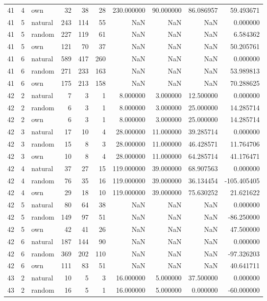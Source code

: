 \begin{table}[htbp]
\begin{tabular}{rrlrrrrrrr}
41 & 4 & own & 32 & 38 & 28 & 230.000000 & 90.000000 & 86.086957 & 59.493671 \\
41 & 5 & natural & 243 & 114 & 55 & NaN & NaN & NaN & 0.000000 \\
41 & 5 & random & 227 & 119 & 61 & NaN & NaN & NaN & 6.584362 \\
41 & 5 & own & 121 & 70 & 37 & NaN & NaN & NaN & 50.205761 \\
41 & 6 & natural & 589 & 417 & 260 & NaN & NaN & NaN & 0.000000 \\
41 & 6 & random & 271 & 233 & 163 & NaN & NaN & NaN & 53.989813 \\
41 & 6 & own & 175 & 213 & 158 & NaN & NaN & NaN & 70.288625 \\
42 & 2 & natural & 7 & 3 & 1 & 8.000000 & 3.000000 & 12.500000 & 0.000000 \\
42 & 2 & random & 6 & 3 & 1 & 8.000000 & 3.000000 & 25.000000 & 14.285714 \\
42 & 2 & own & 6 & 3 & 1 & 8.000000 & 3.000000 & 25.000000 & 14.285714 \\
42 & 3 & natural & 17 & 10 & 4 & 28.000000 & 11.000000 & 39.285714 & 0.000000 \\
42 & 3 & random & 15 & 8 & 3 & 28.000000 & 11.000000 & 46.428571 & 11.764706 \\
42 & 3 & own & 10 & 8 & 4 & 28.000000 & 11.000000 & 64.285714 & 41.176471 \\
42 & 4 & natural & 37 & 27 & 15 & 119.000000 & 39.000000 & 68.907563 & 0.000000 \\
42 & 4 & random & 76 & 35 & 16 & 119.000000 & 39.000000 & 36.134454 & -105.405405 \\
42 & 4 & own & 29 & 18 & 10 & 119.000000 & 39.000000 & 75.630252 & 21.621622 \\
42 & 5 & natural & 80 & 64 & 38 & NaN & NaN & NaN & 0.000000 \\
42 & 5 & random & 149 & 97 & 51 & NaN & NaN & NaN & -86.250000 \\
42 & 5 & own & 42 & 41 & 26 & NaN & NaN & NaN & 47.500000 \\
42 & 6 & natural & 187 & 144 & 90 & NaN & NaN & NaN & 0.000000 \\
42 & 6 & random & 369 & 202 & 110 & NaN & NaN & NaN & -97.326203 \\
42 & 6 & own & 111 & 83 & 51 & NaN & NaN & NaN & 40.641711 \\
43 & 2 & natural & 10 & 5 & 3 & 16.000000 & 5.000000 & 37.500000 & 0.000000 \\
43 & 2 & random & 16 & 5 & 1 & 16.000000 & 5.000000 & 0.000000 & -60.000000 \\

\end{tabular}
\end{table}
